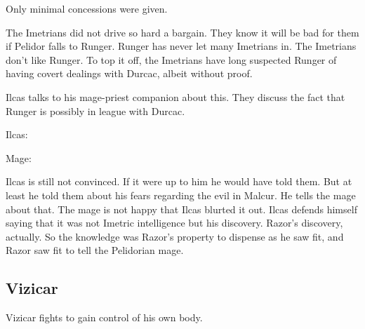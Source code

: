 \begin{garbage}
Only minimal concessions were given. 

The Imetrians did not drive so hard a bargain. 
They know it will be bad for them if Pelidor falls to Runger. 
Runger has never let many Imetrians in. 
The Imetrians don't like Runger. 
To top it off, the Imetrians have long suspected Runger of having covert dealings with Durcac, albeit without proof. 

Ilcas talks to his mage-priest companion about this. 
They discuss the fact that Runger is possibly in league with Durcac. 

\begin{prose}
  Ilcas: 
  
  Mage: 
\end{prose}

Ilcas is still not convinced. 
If it were up to him he would have told them. 
But at least he told them about his fears regarding the evil in Malcur. 
He tells the mage about that. 
The mage is not happy that Ilcas blurted it out. 
Ilcas defends himself saying that it was not Imetric intelligence but his discovery. 
Razor's discovery, actually. 
So the knowledge was Razor's property to dispense as he saw fit, and Razor saw fit to tell the Pelidorian mage. 










\subsection{Vizicar}
Vizicar fights to gain control of his own body. 

\end{garbage}
